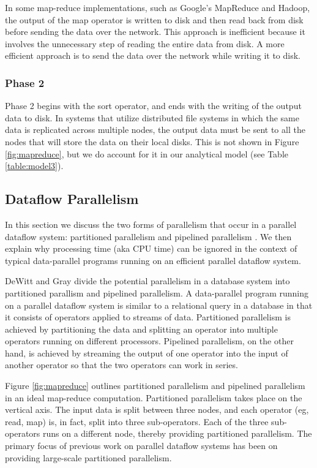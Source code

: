 \documentclass[ 11pt, letterpaper]{article}%
\begin{document}
In some map-reduce implementations, such as Google's MapReduce and Hadoop, the
output of the map operator is written to disk and then read back from disk
before sending the data over the network. This approach is inefficient because
it involves the unnecessary step of reading the entire data from disk. A more
efficient approach is to send the data over the network while writing it to
disk.

\subsubsection{Phase 2}

Phase 2 begins with the sort operator, and ends with the writing of the output
data to disk. In systems that utilize distributed file systems in which the
same data is replicated across multiple nodes, the output data must be sent to
all the nodes that will store the data on their local disks. This is not shown
in Figure \ref{fig:mapreduce}, but we do account for it in our analytical
model (see Table \ref{table:model3}).

\subsection{Dataflow Parallelism}

In this section we discuss the two forms of parallelism that occur in a
parallel dataflow system: partitioned parallelism and pipelined parallelism
\cite{paralleldatabases}. We then explain why processing time (aka CPU time) can be ignored in the context
of typical data-parallel programs running on an efficient parallel dataflow
system.

DeWitt and Gray \cite{paralleldatabases} divide the potential parallelism in a
database system into partitioned parallism and pipelined parallelism. A
data-parallel program running on a parallel dataflow system is similar to a
relational query in a database in that it consists of operators applied to
streams of data. Partitioned parallelism is achieved by partitioning the data
and splitting an operator into multiple operators running on different
processors. Pipelined parallelism, on the other hand, is achieved by
streaming the output of one operator into the input of another operator so that
the two operators can work in series.

Figure \ref{fig:mapreduce} outlines partitioned parallelism and pipelined
parallelism in an ideal map-reduce computation. Partitioned parallelism takes place on the
vertical axis. The input data is split between three nodes, and each operator
(eg, read, map) is, in fact, split into three sub-operators. Each of the three
sub-operators runs on a different node, thereby providing partitioned
parallelism. The primary focus of previous work on parallel dataflow systems
has been on providing large-scale partitioned parallelism.
\end{document}
